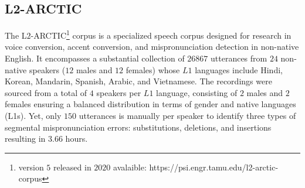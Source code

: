 \subsection{L2-ARCTIC \cite{L2-ARCTIC}}
The L$2$-ARCTIC\footnote{version $5$ released in $2020$ avalaible: https://psi.engr.tamu.edu/l2-arctic-corpus} corpus is a specialized speech corpus designed for research in voice conversion, accent conversion, and mispronunciation detection in non-native English. It encompasses a substantial collection of $26867$ utterances from $24$ non-native speakers ($12$ males and $12$ females) whose $L1$ languages include Hindi, Korean, Mandarin, Spanish, Arabic, and Vietnamese. The recordings were sourced from a total of $4$ speakers per $L1$ language, consisting of $2$ males and $2$ females ensuring a balanced distribution in terms of gender and native languages (L1s). Yet, only $150$ utterances is manually per speaker to identify three types of segmental mispronunciation errors: substitutions, deletions, and insertions resulting in $3.66$ hours.



